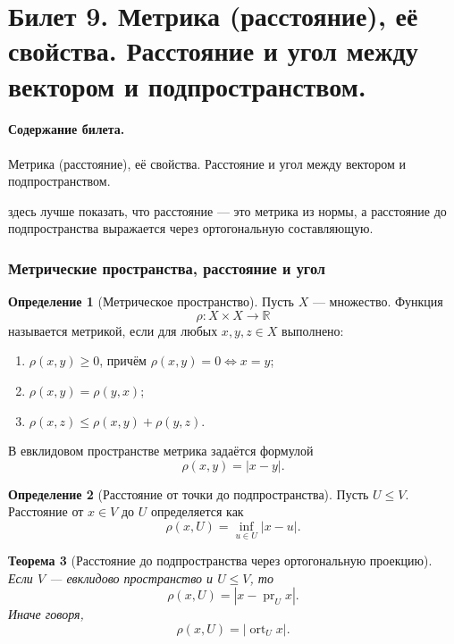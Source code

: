 \documentclass[12pt,a4paper]{article}
\theoremstyle{definition}
\newtheorem{definition}{Определение}[section]
\theoremstyle{plain}
\newtheorem{theorem}[definition]{Теорема}
\theoremstyle{remark}
\newenvironment{planadd}{\begin{planbox}}{\end{planbox}}
\newcommand{\R}{\mathbb{R}}
\newcommand{\pr}{\operatorname{pr}}
\newcommand{\ort}{\operatorname{ort}}
\begin{document}
\clearpage

\section{Билет 9. Метрика (расстояние), её свойства. Расстояние и угол между вектором и подпространством.}

\paragraph{Содержание билета.} Метрика (расстояние), её свойства. Расстояние и угол между вектором и подпространством.

\begin{planadd}

здесь лучше показать, что расстояние — это метрика из нормы, а расстояние до подпространства выражается через ортогональную составляющую.

\end{planadd}

\subsubsection{Метрические пространства, расстояние и угол}


\begin{definition}[Метрическое пространство]
Пусть $X$ --- множество. Функция
\[
    \rho:X\times X\to\R
\]
называется метрикой, если для любых $x,y,z\in X$ выполнено:
\begin{enumerate}[label=\arabic*)]
    \item $\rho(x,y)\ge0$, причём $\rho(x,y)=0\Longleftrightarrow x=y$;
    \item $\rho(x,y)=\rho(y,x)$;
    \item $\rho(x,z)\le \rho(x,y)+\rho(y,z)$.
\end{enumerate}
\end{definition}

В евклидовом пространстве метрика задаётся формулой
\[
    \rho(x,y)=|x-y|.
\]

\begin{definition}[Расстояние от точки до подпространства]
Пусть $U\le V$. Расстояние от $x\in V$ до $U$ определяется как
\[
    \rho(x,U)=\inf_{u\in U}|x-u|.
\]
\end{definition}

\begin{theorem}[Расстояние до подпространства через ортогональную проекцию]
Если $V$ --- евклидово пространство и $U\le V$, то
\[
    \rho(x,U)=|x-\pr_U x|.
\]
Иначе говоря,
\[
    \rho(x,U)=|\ort_U x|.
\]
\end{theorem}
\end{document}
